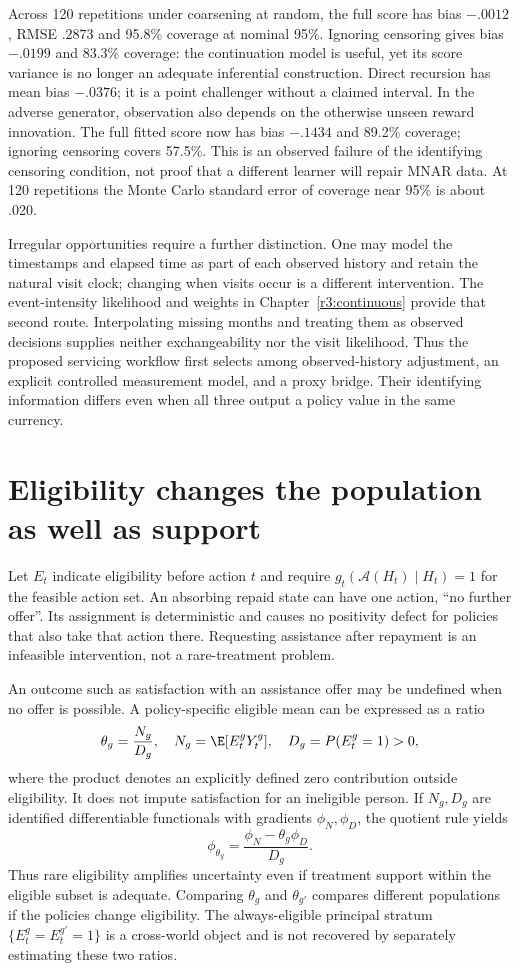 Across 120 repetitions under coarsening at random, the full score has bias
$-.0012$, RMSE $.2873$ and 95.8\% coverage at nominal 95\%. Ignoring
censoring gives bias $-.0199$ and 83.3\% coverage: the continuation model
is useful, yet its score variance is no longer an adequate inferential
construction. Direct recursion has mean bias $-.0376$; it is a point
challenger without a claimed interval. In the adverse generator, observation
also depends on the otherwise unseen reward innovation. The full fitted
score now has bias $-.1434$ and 89.2\% coverage; ignoring censoring covers
57.5\%. This is an observed failure of the identifying censoring condition,
not proof that a different learner will repair MNAR data. At 120 repetitions
the Monte Carlo standard error of coverage near 95\% is about .020.

Irregular opportunities require a further distinction. One may model the
timestamps and elapsed time as part of each observed history and retain the
natural visit clock; changing when visits occur is a different intervention.
The event-intensity likelihood and weights in Chapter~\ref{r3:continuous}
provide that second route. Interpolating missing months and treating them as
observed decisions supplies neither exchangeability nor the visit likelihood.
Thus the proposed servicing workflow first selects among observed-history
adjustment, an explicit controlled measurement model, and a proxy bridge.
Their identifying information differs even when all three output a policy
value in the same currency.




\section{Eligibility changes the population as well as support}
\label{r3:eligibility}
Let $E_t$ indicate eligibility before action $t$ and require
$g_t(\mathcal A(H_t)\mid H_t)=1$ for the feasible action set.
An absorbing repaid state can have one action, ``no further offer''.
Its assignment is deterministic and causes no positivity defect for
policies that also take that action there. Requesting assistance after
repayment is an infeasible intervention, not a rare-treatment problem.

An outcome such as satisfaction with an assistance offer may be
undefined when no offer is possible. A policy-specific eligible mean
can be expressed as a ratio
\[
 \theta_g=\frac{N_g}{D_g},\quad
 N_g=\E[E_t^gY_t^g],\quad D_g=P(E_t^g=1)>0,
\]
where the product denotes an explicitly defined zero contribution
outside eligibility. It does not impute satisfaction for an ineligible
person. If $N_g,D_g$ are identified differentiable functionals with
gradients $\phi_N,\phi_D$, the quotient rule yields
\[
 \phi_{\theta_g}=\frac{\phi_N-\theta_g\phi_D}{D_g}.
\]
Thus rare eligibility amplifies uncertainty even if treatment support
within the eligible subset is adequate. Comparing $\theta_g$ and
$\theta_{g'}$ compares different populations if the policies change
eligibility. The always-eligible principal stratum
$\{E_t^g=E_t^{g'}=1\}$ is a cross-world object and is not recovered
by separately estimating these two ratios.

